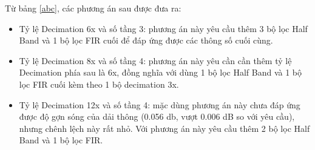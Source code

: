  \noindent Từ bảng \ref{abc}, các phương án sau được đưa ra:
\begin{itemize}
    \item Tỷ lệ Decimation 6x và số tầng 3: phương án này yêu cầu thêm 3 bộ lọc Half Band và 1 bộ lọc FIR cuối để đáp ứng được các thông số cuối cùng.
    \item Tỷ lệ Decimation 8x và số tầng 4: phương án này yêu cần cần thêm tỷ lệ Decimation phía sau là 6x, đồng nghĩa với dùng 1 bộ lọc Half Band và 1 bộ lọc FIR cuối kèm theo 1 bộ decimation 3x.
    \item Tỷ lệ Decimation 12x và số tầng 4: mặc dùng phương án này chưa đáp ứng được độ gợn sóng của dải thông (0.056 db, vượt 0.006 dB so với yêu cầu), nhưng chênh lệch này rất nhỏ. Với phương án này yêu cầu thêm 2 bộ lọc Half Band và 1 bộ lọc FIR. \label{choose}
\end{itemize}
\vspace{2.5cm}
